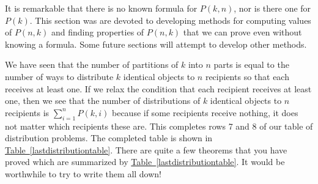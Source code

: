 \documentclass[10pt,]{book}
\theoremstyle{plain}
\theoremstyle{definition}
\theoremstyle{definition}
\numberwithin{equation}{chapter}
\begin{document}
It is remarkable that there is no known formula for \(P(k,n)\), nor is there one for \(P(k)\). This section was are devoted to developing methods for computing values of \(P(n,k)\) and finding properties of \(P(n,k)\) that we can prove even without knowing a formula. Some future sections will attempt to develop other methods.%
\par
We have seen that the number of partitions of \(k\) into \(n\) parts is equal to the number of ways to distribute \(k\) identical objects to \(n\) recipients so that each receives at least one. If we relax the condition that each recipient receives at least one, then we see that the number of distributions of \(k\) identical objects to \(n\) recipients is \(\sum_{i=1}^n P(k,i)\) because if some recipients receive nothing, it does not matter which recipients these are. This completes rows 7 and 8 of our table of distribution problems. The completed table is shown in \hyperref[lastdistributiontable]{Table~\ref{lastdistributiontable}}. There are quite a few theorems that you have proved which are summarized by \hyperref[lastdistributiontable]{Table~\ref{lastdistributiontable}}.  It would be worthwhile to try to write them all down!%
\end{document}
